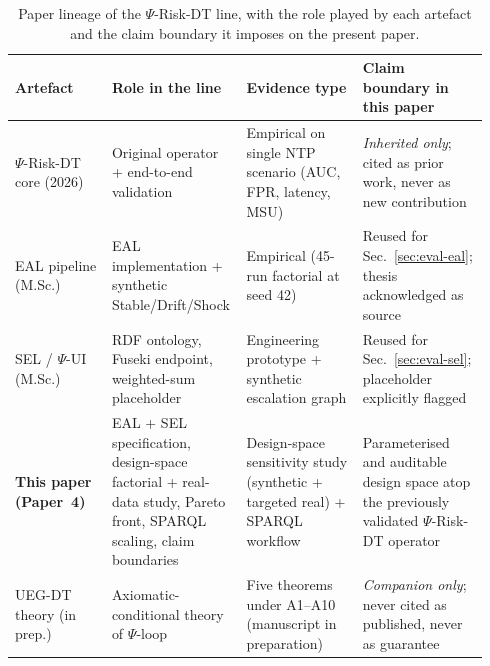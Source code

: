 \documentclass[runningheads]{llncs}
\newcommand{\psiop}{\ensuremath{\Psi}}
\begin{document}
\begin{table}[t]
\centering
\caption{Paper lineage of the $\psiop$-Risk-DT line, with the role
played by each artefact and the claim boundary it imposes on the present
paper.}
\label{tab:lineage}
\small
\begin{tabular}{@{}p{0.20\linewidth}p{0.24\linewidth}p{0.24\linewidth}p{0.26\linewidth}@{}}
\toprule
\textbf{Artefact} & \textbf{Role in the line} & \textbf{Evidence type}
  & \textbf{Claim boundary in this paper} \\
\midrule
\cite{paper3} $\psiop$-Risk-DT core (2026) &
Original operator + end-to-end validation &
Empirical on single NTP scenario (AUC, FPR, latency, MSU) &
\emph{Inherited only}; cited as prior work, never as new contribution \\
\cite{berto2026} EAL pipeline (M.Sc.) &
EAL implementation + synthetic Stable/Drift/Shock &
Empirical (45-run factorial at seed 42) &
Reused for Sec.~\ref{sec:eval-eal}; thesis acknowledged as source \\
\cite{vartic2026} SEL / $\psiop$-UI (M.Sc.) &
RDF ontology, Fuseki endpoint, weighted-sum placeholder &
Engineering prototype + synthetic escalation graph &
Reused for Sec.~\ref{sec:eval-sel}; placeholder explicitly flagged \\
\textbf{This paper (Paper~4)} &
EAL + SEL specification, design-space factorial + real-data study,
Pareto front, SPARQL scaling, claim boundaries &
Design-space sensitivity study (synthetic + targeted real) + SPARQL
workflow &
Parameterised and auditable design space atop the previously
validated $\psiop$-Risk-DT operator \\
\cite{paper5} UEG-DT theory (in prep.) &
Axiomatic-conditional theory of $\psiop$-loop &
Five theorems under A1--A10 (manuscript in preparation) &
\emph{Companion only}; never cited as published, never as guarantee \\
\bottomrule
\end{tabular}
\end{table}
\end{document}
